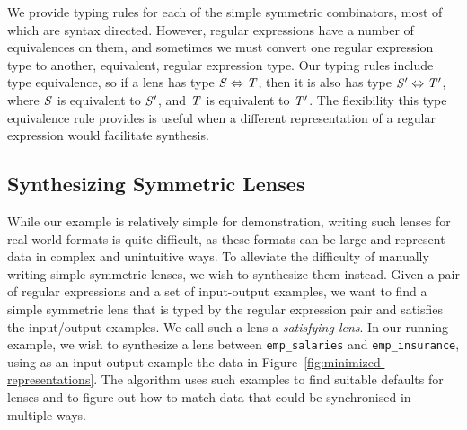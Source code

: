 \documentclass[acmsmall,screen,anonymous]{acmart}
\begin{document}


We provide typing rules for each of the simple symmetric combinators, most of
which are syntax directed. However, regular expressions have a number of
equivalences on them, and sometimes we must convert one regular expression type
to another, equivalent, regular expression type. Our typing rules include type
equivalence, so if a lens has type $\mathit{S} \Leftrightarrow \mathit{T}$, then it
is also has type $\mathit{S}' \Leftrightarrow \mathit{T}'$, where $\mathit{S}$ is
equivalent to $\mathit{S}'$, and $\mathit{T}$ is equivalent to $\mathit{T}'$. The
flexibility this type equivalence rule provides is useful when a different
representation of a regular expression would facilitate synthesis.



\subsection{Synthesizing Symmetric Lenses}

While our example is relatively simple for demonstration, writing such lenses
for real-world formats is quite difficult, as these formats can be large and
represent data in complex and unintuitive ways. To alleviate the difficulty of
manually writing simple symmetric lenses, we wish to synthesize them instead.
Given a pair of regular expressions and a set of input-output examples, we want
to find a simple symmetric lens that is typed by the regular expression pair and
satisfies the input/output examples. We call such a lens a \emph{satisfying
  lens}. In our running example, we wish to synthesize a lens between
\lstinline{emp_salaries} and \lstinline{emp_insurance}, using as an input-output
example the data in Figure~\ref{fig:minimized-representations}. The algorithm
uses such examples to find suitable defaults for \Disconnect lenses and to
figure out how to match data that could be synchronised in multiple ways.
\end{document}
